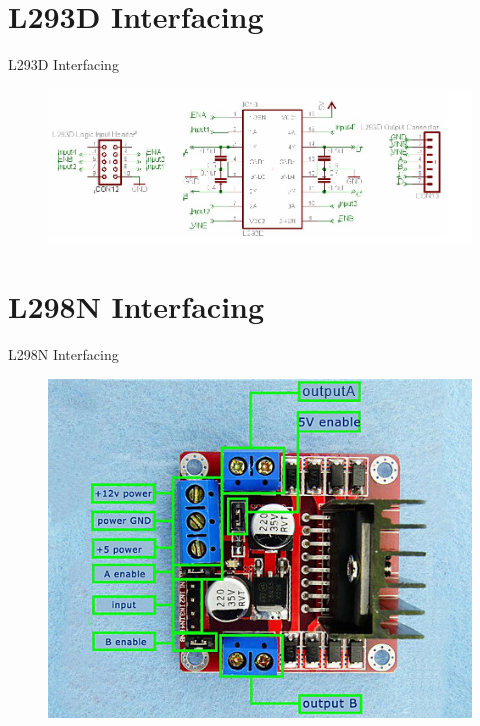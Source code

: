 \documentclass[10pt, a4paper]{beamer}
\begin{document}
\section{L293D Interfacing}
\begin{frame}{L293D Interfacing}
	\begin{figure}
		\includegraphics[scale=0.4]{L293d.jpg}
	\end{figure}
\end{frame}

\section{L298N Interfacing}
\begin{frame}{L298N Interfacing}
	\begin{figure}
		\includegraphics[scale=0.03]{l298n.jpg}
	\end{figure}
\end{frame}
\end{document}
